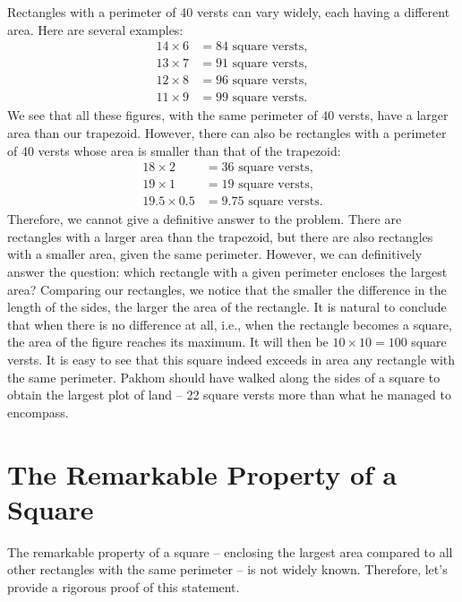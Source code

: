 \ques Rectangles with a perimeter of 40 versts can vary widely, each having a different area. Here are several examples:
\begin{align*}%
14 \times 6 & = 84 \,\, \text{square versts},\\
13 \times 7 & = 91 \,\, \text{square versts},\\
12 \times 8 & = 96 \,\, \text{square versts},\\
11 \times 9 & = 99\,\, \text{square versts}.
\end{align*}
We see that all these figures, with the same perimeter of 40 versts, have a larger area than our trapezoid. However, there can also be rectangles with a perimeter of 40 versts whose area is smaller than that of the trapezoid:
\begin{align*}%
18 \times 2 & = 36 \,\, \text{square versts},\\
19 \times 1 & = 19 \,\, \text{square versts},\\
19.5 \times 0.5 & = 9.75 \,\, \text{square versts}.
\end{align*}
Therefore, we cannot give a definitive answer to the problem. There are rectangles with a larger area than the trapezoid, but there are also rectangles with a smaller area, given the same perimeter. However, we can definitively answer the question: which rectangle with a given perimeter encloses the largest area? Comparing our rectangles, we notice that the smaller the difference in the length of the sides, the larger the area of the rectangle. It is natural to conclude that when there is no difference at all, i.e., when the rectangle becomes a square, the area of the figure reaches its maximum. It will then be $10 \times 10 = 100$ square versts. It is easy to see that this square indeed exceeds in area any rectangle with the same perimeter. Pakhom should have walked along the sides of a square to obtain the largest plot of land -- 22 square versts more than what he managed to encompass.
\clearpage

\section{The Remarkable Property of a Square}
\label{sec-12.4}

The remarkable property of a square -- enclosing the largest area compared to all other rectangles with the same perimeter -- is not widely known. Therefore, let's provide a rigorous proof of this statement.

